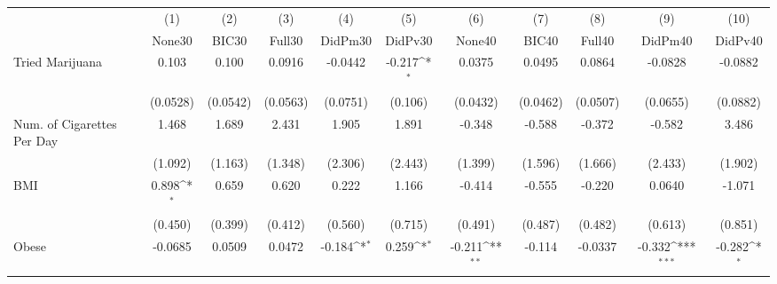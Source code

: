 {
\def\sym#1{\ifmmode^{#1}\else\(^{#1}\)\fi}
\begin{tabular}{l*{10}{c}}
\toprule
            &\multicolumn{1}{c}{(1)}&\multicolumn{1}{c}{(2)}&\multicolumn{1}{c}{(3)}&\multicolumn{1}{c}{(4)}&\multicolumn{1}{c}{(5)}&\multicolumn{1}{c}{(6)}&\multicolumn{1}{c}{(7)}&\multicolumn{1}{c}{(8)}&\multicolumn{1}{c}{(9)}&\multicolumn{1}{c}{(10)}\\
            &\multicolumn{1}{c}{None30}&\multicolumn{1}{c}{BIC30}&\multicolumn{1}{c}{Full30}&\multicolumn{1}{c}{DidPm30}&\multicolumn{1}{c}{DidPv30}&\multicolumn{1}{c}{None40}&\multicolumn{1}{c}{BIC40}&\multicolumn{1}{c}{Full40}&\multicolumn{1}{c}{DidPm40}&\multicolumn{1}{c}{DidPv40}\\
\midrule
Tried Marijuana&       0.103         &       0.100         &      0.0916         &     -0.0442         &      -0.217\sym{*}  &      0.0375         &      0.0495         &      0.0864         &     -0.0828         &     -0.0882         \\
            &    (0.0528)         &    (0.0542)         &    (0.0563)         &    (0.0751)         &     (0.106)         &    (0.0432)         &    (0.0462)         &    (0.0507)         &    (0.0655)         &    (0.0882)         \\
\addlinespace
Num. of Cigarettes Per Day&       1.468         &       1.689         &       2.431         &       1.905         &       1.891         &      -0.348         &      -0.588         &      -0.372         &      -0.582         &       3.486         \\
            &     (1.092)         &     (1.163)         &     (1.348)         &     (2.306)         &     (2.443)         &     (1.399)         &     (1.596)         &     (1.666)         &     (2.433)         &     (1.902)         \\
\addlinespace
BMI         &       0.898\sym{*}  &       0.659         &       0.620         &       0.222         &       1.166         &      -0.414         &      -0.555         &      -0.220         &      0.0640         &      -1.071         \\
            &     (0.450)         &     (0.399)         &     (0.412)         &     (0.560)         &     (0.715)         &     (0.491)         &     (0.487)         &     (0.482)         &     (0.613)         &     (0.851)         \\
\addlinespace
Obese       &     -0.0685         &      0.0509         &      0.0472         &      -0.184\sym{*}  &       0.259\sym{*}  &      -0.211\sym{**} &      -0.114         &     -0.0337         &      -0.332\sym{***}&      -0.282\sym{*}  \\

\end{tabular}}
